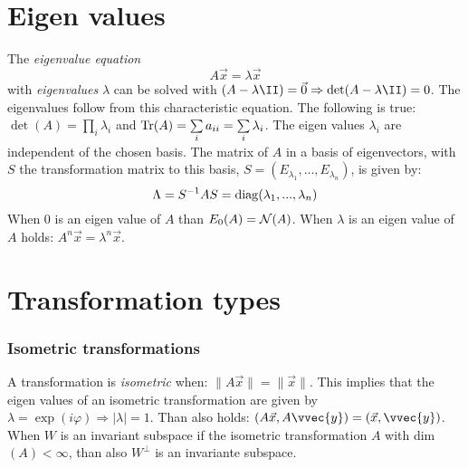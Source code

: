 \section{Eigen values}
The {\it eigenvalue equation}
\[
A\vec{x}=\lambda\vec{x}
\]
with {\it eigenvalues} $\lambda$ can be solved with
$(A-\lambda\II)=\vec{0}\Rightarrow\det(A-\lambda\II)=0$. The eigenvalues
follow from this characteristic equation. The following is true:
$\det(A)=\prod\limits_i\lambda_i$ and
${\rm Tr}(A)=\sum\limits_ia_{ii}=\sum\limits_i\lambda_i$.
\npar
The eigen values $\lambda_i$ are independent of the chosen basis.
The matrix of $A$ in a basis of eigenvectors, with $S$ the transformation matrix
to this basis, $S=(E_{\lambda_1},...,E_{\lambda_n})$, is given by:
\[
\Lambda=S^{-1}AS={\rm diag}(\lambda_1,...,\lambda_n)
\]
When 0 is an eigen value of $A$ than $E_0(A)={\cal N}(A)$.
\npar
When $\lambda$ is an eigen value of $A$ holds: $A^n\vec{x}=\lambda^n\vec{x}$.

\section{Transformation types}
\subsubsection{Isometric transformations}
A transformation is {\it isometric} when: $\|A\vec{x}\|=\|\vec{x}\|$. This
implies that the eigen values of an isometric transformation are given by
$\lambda=\exp(i\varphi)\Rightarrow|\lambda|=1$. Than also holds:
$(A\vec{x},A\vvec{y})=(\vec{x},\vvec{y})$.
\npar
When $W$ is an invariant subspace if the isometric transformation $A$ with
dim$(A)<\infty$, than also $W^\perp$ is an invariante subspace.

